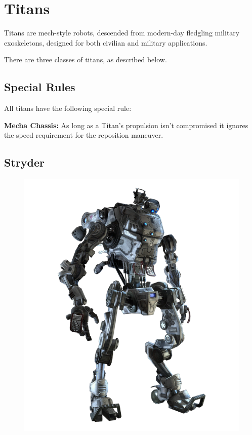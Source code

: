 \documentclass[9pt, openany]{extbook}
\begin{document}

\chapter{Titans}
\label{chap:titans}

Titans are mech-style robots, descended from modern-day fledgling military exoskeletons, designed for both civilian and military applications. 

There are three classes of titans, as described below.

\section{Special Rules}
\label{sec:specialrules}

All titans have the following special rule:

\textbf{Mecha Chassis:} As long as a Titan's propulsion isn't compromised it ignores the speed requirement for the reposition maneuver.

\section{Stryder}
\label{sec:stryder}
\begin{figure}
\vspace*{-2em}
\includegraphics[width=\linewidth]{Stryder}
\end{figure}
\end{document}
